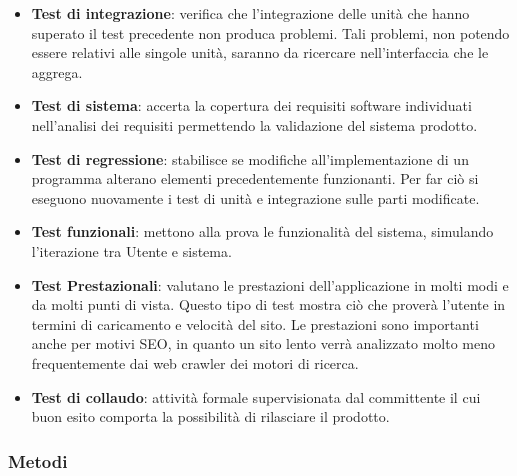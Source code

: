 \begin{itemize}
\begin{itemize}
\item \textbf{Test di integrazione}: verifica che l'integrazione delle unità che hanno superato il test precedente non produca problemi. Tali problemi, non potendo essere relativi alle singole unità, saranno da ricercare nell'interfaccia che le aggrega.

\item \textbf{Test di sistema}: accerta la copertura dei requisiti software individuati nell'analisi dei requisiti permettendo la validazione del sistema prodotto.

\item \textbf{Test di regressione}: stabilisce se modifiche all'implementazione di un programma alterano elementi precedentemente funzionanti. Per far ciò si eseguono nuovamente i test di unità e integrazione sulle parti modificate.

\item \textbf{Test funzionali}: mettono alla prova le funzionalità del sistema, simulando l'iterazione tra Utente e sistema.

\item \textbf{Test Prestazionali}: valutano le prestazioni dell'applicazione in molti modi e da molti punti di vista. Questo tipo di test mostra ciò che proverà l'utente in termini di caricamento e velocità del sito. Le prestazioni sono importanti anche per motivi SEO, in quanto un sito lento verrà analizzato molto meno frequentemente dai web crawler dei motori di ricerca.

\item \textbf{Test di collaudo}: attività formale supervisionata dal committente il cui buon esito comporta la possibilità di rilasciare il prodotto.
\end{itemize}
\end{itemize}
\subsubsection{Metodi}

